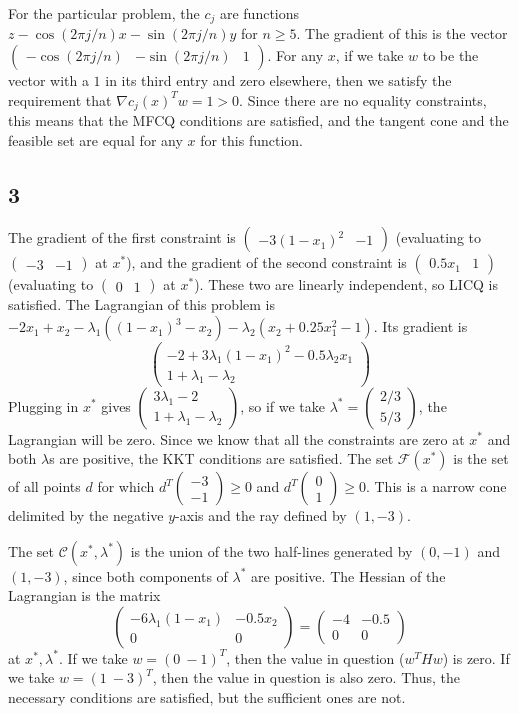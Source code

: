 \documentclass{article}
\newcommand{\openm}{\begin{pmatrix}}
\newcommand{\closem}{\end{pmatrix}}
\begin{document}
For the particular problem, the $c_j$ are functions $z-\cos(2\pi j/n)x-\sin(2\pi j/n)y$ for $n\geq5$. The gradient of this is the vector $\openm -\cos(2\pi j/n)&-\sin(2\pi j/n)&1\closem$. For any $x$, if we take $w$ to be the vector with a $1$ in its third entry and zero elsewhere, then we satisfy the requirement that $\nabla c_j(x)^Tw=1>0$. Since there are no equality constraints, this means that the MFCQ conditions are satisfied, and the tangent cone and the feasible set are equal for any $x$ for this function.
\subsection*{3}
The gradient of the first constraint is $\openm-3(1-x_1)^2&-1\closem$ (evaluating to $\openm -3&-1\closem$ at $x^*$), and the gradient of the second constraint is $\openm0.5x_1&1\closem$ (evaluating to $\openm 0&1\closem$ at $x^*$). These two are linearly independent, so LICQ is satisfied.
The Lagrangian of this problem is $-2x_1+x_2-\lambda_1((1-x_1)^3-x_2)-\lambda_2(x_2+0.25x_1^2-1)$. Its gradient is
\[\openm-2+3\lambda_1(1-x_1)^2-0.5\lambda_2x_1\\1+\lambda_1-\lambda_2\closem\]
Plugging in $x^*$ gives $\openm 3\lambda_1-2\\1+\lambda_1-\lambda_2\closem$, so if we take $\lambda^*=\openm2/3\\5/3\closem$, the Lagrangian will be zero. Since we know that all the constraints are zero at $x^*$ and both $\lambda$s are positive, the KKT conditions are satisfied.
The set $\mathscr{F}(x^*)$ is the set of all points $d$ for which $d^T\openm-3\\-1\closem\geq0$ and $d^T\openm0\\1\closem\geq0$. This is a narrow cone delimited by the negative $y$-axis and the ray defined by $(1,-3)$. 

The set $\mathscr{C}(x^*, \lambda^*)$ is the union of the two half-lines generated by $(0, -1)$ and $(1, -3)$, since both components of $\lambda^*$ are positive.
The Hessian of the Lagrangian is the matrix
\[\openm -6\lambda_1(1-x_1)&-0.5x_2\\0&0\closem=\openm-4&-0.5\\0&0\closem\]
at $x^*, \lambda^*$. 
If we take $w=(0\ -1)^T$, then the value in question ($w^THw$) is zero. If we take $w=(1\ -3)^T$, then the value in question is also zero. Thus, the necessary conditions are satisfied, but the sufficient ones are not.
\end{document}

